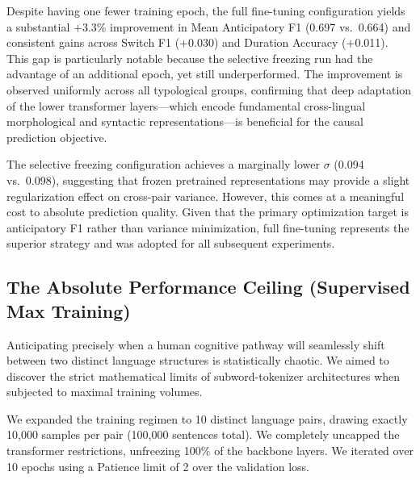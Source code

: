 \documentclass[sigconf,nonacm]{acmart}
\begin{document}
Despite having one fewer training epoch, the full fine-tuning configuration yields a substantial $+$3.3\% improvement in Mean Anticipatory F1 (0.697 vs.\ 0.664) and consistent gains across Switch F1 ($+$0.030) and Duration Accuracy ($+$0.011). This gap is particularly notable because the selective freezing run had the advantage of an additional epoch, yet still underperformed. The improvement is observed uniformly across all typological groups, confirming that deep adaptation of the lower transformer layers---which encode fundamental cross-lingual morphological and syntactic representations---is beneficial for the causal prediction objective.

The selective freezing configuration achieves a marginally lower $\sigma$ (0.094 vs.\ 0.098), suggesting that frozen pretrained representations may provide a slight regularization effect on cross-pair variance. However, this comes at a meaningful cost to absolute prediction quality. Given that the primary optimization target is anticipatory F1 rather than variance minimization, full fine-tuning represents the superior strategy and was adopted for all subsequent experiments.

\subsection{The Absolute Performance Ceiling (Supervised Max Training)}
Anticipating precisely when a human cognitive pathway will seamlessly shift between two distinct language structures is statistically chaotic. We aimed to discover the strict mathematical limits of subword-tokenizer architectures when subjected to maximal training volumes.

We expanded the training regimen to 10 distinct language pairs, drawing exactly 10,000 samples per pair (100,000 sentences total). We completely uncapped the transformer restrictions, unfreezing 100\% of the backbone layers. We iterated over 10 epochs using a Patience limit of 2 over the validation loss.
\end{document}
